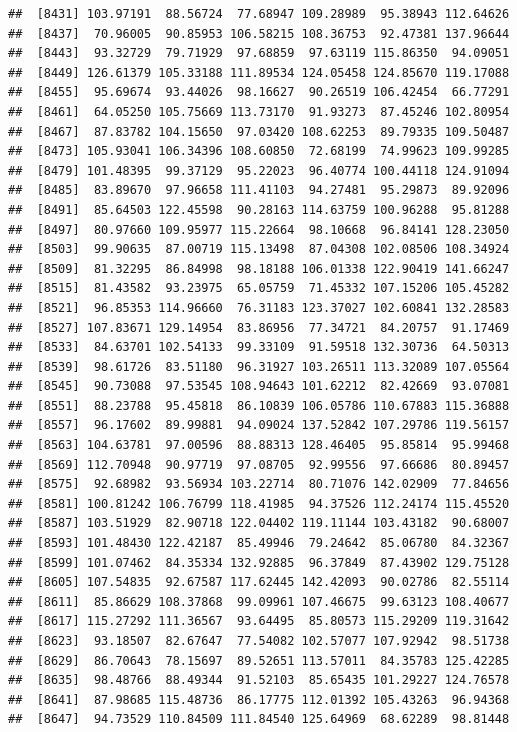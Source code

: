 \documentclass[
]{article}
\begin{document}
\begin{verbatim}
##  [8431] 103.97191  88.56724  77.68947 109.28989  95.38943 112.64626
##  [8437]  70.96005  90.85953 106.58215 108.36753  92.47381 137.96644
##  [8443]  93.32729  79.71929  97.68859  97.63119 115.86350  94.09051
##  [8449] 126.61379 105.33188 111.89534 124.05458 124.85670 119.17088
##  [8455]  95.69674  93.44026  98.16627  90.26519 106.42454  66.77291
##  [8461]  64.05250 105.75669 113.73170  91.93273  87.45246 102.80954
##  [8467]  87.83782 104.15650  97.03420 108.62253  89.79335 109.50487
##  [8473] 105.93041 106.34396 108.60850  72.68199  74.99623 109.99285
##  [8479] 101.48395  99.37129  95.22023  96.40774 100.44118 124.91094
##  [8485]  83.89670  97.96658 111.41103  94.27481  95.29873  89.92096
##  [8491]  85.64503 122.45598  90.28163 114.63759 100.96288  95.81288
##  [8497]  80.97660 109.95977 115.22664  98.10668  96.84141 128.23050
##  [8503]  99.90635  87.00719 115.13498  87.04308 102.08506 108.34924
##  [8509]  81.32295  86.84998  98.18188 106.01338 122.90419 141.66247
##  [8515]  81.43582  93.23975  65.05759  71.45332 107.15206 105.45282
##  [8521]  96.85353 114.96660  76.31183 123.37027 102.60841 132.28583
##  [8527] 107.83671 129.14954  83.86956  77.34721  84.20757  91.17469
##  [8533]  84.63701 102.54133  99.33109  91.59518 132.30736  64.50313
##  [8539]  98.61726  83.51180  96.31927 103.26511 113.32089 107.05564
##  [8545]  90.73088  97.53545 108.94643 101.62212  82.42669  93.07081
##  [8551]  88.23788  95.45818  86.10839 106.05786 110.67883 115.36888
##  [8557]  96.17602  89.99881  94.09024 137.52842 107.29786 119.56157
##  [8563] 104.63781  97.00596  88.88313 128.46405  95.85814  95.99468
##  [8569] 112.70948  90.97719  97.08705  92.99556  97.66686  80.89457
##  [8575]  92.68982  93.56934 103.22714  80.71076 142.02909  77.84656
##  [8581] 100.81242 106.76799 118.41985  94.37526 112.24174 115.45520
##  [8587] 103.51929  82.90718 122.04402 119.11144 103.43182  90.68007
##  [8593] 101.48430 122.42187  85.49946  79.24642  85.06780  84.32367
##  [8599] 101.07462  84.35334 132.92885  96.37849  87.43902 129.75128
##  [8605] 107.54835  92.67587 117.62445 142.42093  90.02786  82.55114
##  [8611]  85.86629 108.37868  99.09961 107.46675  99.63123 108.40677
##  [8617] 115.27292 111.36567  93.64495  85.80573 115.29209 119.31642
##  [8623]  93.18507  82.67647  77.54082 102.57077 107.92942  98.51738
##  [8629]  86.70643  78.15697  89.52651 113.57011  84.35783 125.42285
##  [8635]  98.48766  88.49344  91.52103  85.65435 101.29227 124.76578
##  [8641]  87.98685 115.48736  86.17775 112.01392 105.43263  96.94368
##  [8647]  94.73529 110.84509 111.84540 125.64969  68.62289  98.81448

\end{verbatim}
\end{document}
